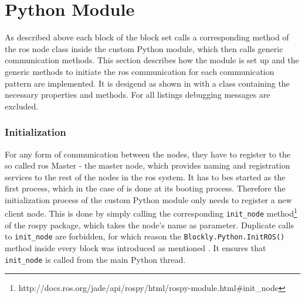 \section{Python Module} \label{sec:PythonModule}
As described above each block of the \hobbit{} block set calls a corresponding method of the \gls{ros} node class inside the custom Python module, which then calls generic communication methods. This section describes how the module is set up and the generic methods to initiate the \gls{ros} communication for each communication pattern are implemented. It is desigend as shown in  with a class containing the necessary properties and methods. For all listings debugging messages are excluded.

\subsubsection{Initialization}
For any form of communication between the nodes, they have to register to the so called \gls{ros} Master - the master node, which provides naming and registration services to the rest of the nodes in the \gls{ros} system. It has to bes started as the first process, which in the case of \hobbit{} is done at its booting process. Therefore the initialization process of the custom Python module only needs to register a new client node. This is done by simply calling the corresponding \lstinline!init_node! method\footnote{http://docs.ros.org/jade/api/rospy/html/rospy-module.html#init\_node} of the rospy package, which takes the node's name as parameter. Duplicate calls to \lstinline!init_node! are forbidden, for which reason the \lstinline!Blockly.Python.InitROS()! method inside every block was introduced as mentioned . It ensures that \lstinline!init_node! is called from the main Python thread.

